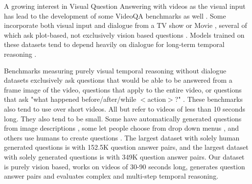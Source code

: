 \documentclass{article}
\newcommand{\mgm}[1]{{\color{cyan}{mgm: #1}}}
\begin{document}
\mgm{how to include new information here without being too repetitive with the introduction?}

A growing interest in Visual Question Answering with videos as the visual input has lead to the development of some VideoQA benchmarks as well \cite{tapaswi2016movieqa, lei2018tvqa, jang2017tgif, kim2017deepstory, xu2017video, maharaj2017dataset, zeng2016leveraging, yu2019activitynet}. Some incorporate both visual input and dialogue from a TV show or Movie \cite{tapaswi2016movieqa, lei2018tvqa, kim2017deepstory}, several of which ask plot-based, not exclusively vision based questions \cite{tapaswi2016movieqa, kim2017deepstory}. Models trained on these datasets tend to depend heavily on dialogue for long-term temporal reasoning \cite{tapaswi2016movieqa, lei2018tvqa}. 

Benchmarks measuring purely visual temporal reasoning without dialogue datasets exclusively ask questions that would be able to be answered from a frame image of the video,  questions that apply to the entire video, or questions that ask "what happened before/after/while $<$action$>$?" \mgm{is there a better way to explain this type of question?}. These benchmarks also tend to use over short videos. All but \cite{yu2019activitynet, xu2017video} refer to videos of less than 10 seconds long. They also tend to be small. Some have automatically generated questions from image descriptions \cite{xu2017video,zeng2016leveraging}, some let people choose from drop down menus \cite{tgif}, and others use humans to create questions \cite{yu2019activitynet, tapaswi2016movieqa, jang2017tgif, lei2018tvqa}. The largest dataset with solely human generated questions is \cite{lei2018tvqa} with 152.5K question answer pairs, and the largest dataset with solely generated questions is \cite{maharaj2017dataset} with 349K question answer pairs. \mgm{add in figure VG slide 5, and table.} Our dataset is purely vision based, works on videos of 30-90 seconds long, generates \mgm{add here} question answer pairs and evaluates complex and multi-step temporal reasoning.

\end{document}
